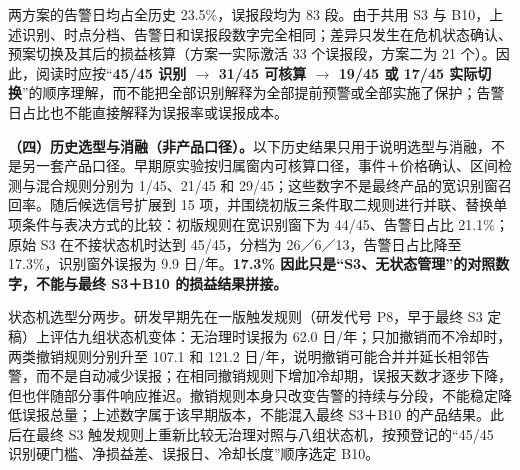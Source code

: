 \documentclass[12pt,a4paper]{ctexart}
\begin{document}
两方案的告警日均占全历史 23.5\%，误报段均为 83 段。由于共用 S3 与 B10，上述识别、时点分档、告警日和误报段数字完全相同；差异只发生在危机状态确认、预案切换及其后的损益核算（方案一实际激活 33 个误报段，方案二为 21 个）。因此，阅读时应按“\textbf{45/45 识别 \(\rightarrow\) 31/45 可核算 \(\rightarrow\) 19/45 或 17/45 实际切换}”的顺序理解，而不能把全部识别解释为全部提前预警或全部实施了保护；告警日占比也不能直接解释为误报率或误报成本。\par
\textbf{（四）历史选型与消融（非产品口径）。}以下历史结果只用于说明选型与消融，不是另一套产品口径。早期原实验按归属窗内可核算口径，事件＋价格确认、区间检测与混合规则分别为 1/45、21/45 和 29/45；这些数字不是最终产品的宽识别窗召回率。随后候选信号扩展到 15 项，并围绕初版三条件取二规则进行并联、替换单项条件与表决方式的比较：初版规则在宽识别窗下为 44/45、告警日占比 21.1\%；原始 S3 在不接状态机时达到 45/45，分档为 26／6／13，告警日占比降至 17.3\%，识别窗外误报为 9.9 日/年。\textbf{17.3\% 因此只是“S3、无状态管理”的对照数字，不能与最终 S3＋B10 的损益结果拼接。}\par
状态机选型分两步。研发早期先在一版触发规则（研发代号 P8，早于最终 S3 定稿）上评估九组状态机变体：无治理时误报为 62.0 日/年；只加撤销而不冷却时，两类撤销规则分别升至 107.1 和 121.2 日/年，说明撤销可能合并并延长相邻告警，而不是自动减少误报；在相同撤销规则下增加冷却期，误报天数才逐步下降，但也伴随部分事件响应推迟。撤销规则本身只改变告警的持续与分段，不能稳定降低误报总量；上述数字属于该早期版本，不能混入最终 S3＋B10 的产品结果。此后在最终 S3 触发规则上重新比较无治理对照与八组状态机，按预登记的“45/45 识别硬门槛、净损益差、误报日、冷却长度”顺序选定 B10。\par
\end{document}
